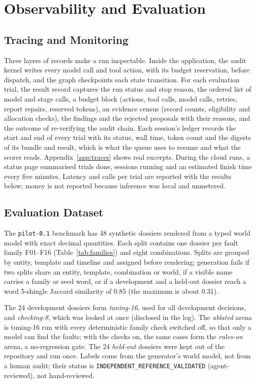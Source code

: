 \chapter{Observability and Evaluation}

\section{Tracing and Monitoring}
Three layers of records make a run inspectable. Inside the application, the audit kernel writes
every model call and tool action, with its budget reservation, before dispatch, and the graph
checkpoints each state transition. For each evaluation trial, the result record captures the run
status and stop reason, the ordered list of model and stage calls, a budget block (actions, tool
calls, model calls, retries, report repairs, reserved tokens), an evidence census (record counts,
eligibility and allocation checks), the findings and the rejected proposals with their reasons, and
the outcome of re-verifying the audit chain. Each session's ledger records the start and end of
every trial with its status, wall time, token count and the digests of its bundle and result,
which is what the queue uses to resume and what the scorer reads. Appendix~\ref{app:traces} shows
real excerpts. During the cloud runs, a status page summarised trials done, sessions running and an
estimated finish time every five minutes. Latency and calls per trial are reported with the
results below; money is not reported because inference was local and unmetered.

\section{Evaluation Dataset}
The \texttt{pilot-0.1} benchmark has 48 synthetic dossiers rendered from a typed world model with
exact decimal quantities. Each split contains one dossier per fault family F01--F16
(Table~\ref{tab:families}) and eight combinations. Splits are grouped by entity, template and
timeline and assigned before rendering; generation fails if two splits share an entity, template,
combination or world, if a visible name carries a family or seed word, or if a development and a
held-out dossier reach a word 5-shingle Jaccard similarity of 0.85 (the maximum is about 0.31).

The 24 development dossiers form \emph{tuning-16}, used for all development decisions, and
\emph{checking-8}, which was looked at once (disclosed in the log). The \emph{ablated} arena is
tuning-16 run with every deterministic family check switched off, so that only a model can find the
faults; with the checks on, the same cases form the \emph{rules-on} arena, a no-regression gate.
The 24 \emph{held-out} dossiers were kept out of the repository and run once. Labels come from the
generator's world model, not from a human audit; their status is
\texttt{INDEPENDENT\_REFERENCE\_VALIDATED} (agent-reviewed), not hand-reviewed.

